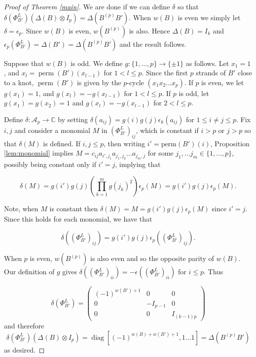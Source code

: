 \documentclass{amsart}[11pt,fullpage]
\def\C{{\mathbb C}}
\def\A{{\mathcal A}}
\newcommand\diag{\operatorname{diag}}
\newcommand\perm{\operatorname{perm}}
\theoremstyle{definition}
\begin{document}
\begin{proof}[Proof of Theorem \ref{main}]
We are done if we can define $\delta$ so that $\delta\left(\Phi_{B'}^L\right)\left(\Delta(B)\otimes I_p\right) = \Delta(B^{(p)}B')$. When $w(B)$ is even we simply let $\delta = \epsilon_p$. Since $w(B)$ is even, $w(B^{(p)})$ is also. Hence $\Delta(B)=I_k$ and $\epsilon_p\left(\Phi_{B'}^L\right) = \Delta(B') = \Delta(B^{(p)}B')$ and the result follows.

Suppose that $w(B)$ is odd. We define $g\colon \{1,\ldots,p\}\rightarrow \{\pm 1\}$ as follows. Let $x_1 = 1$, and $x_l = \perm(B')(x_{l-1})$ for $1<l\le p$. Since the first $p$ strands of $B'$ close to a knot, $\perm(B')$ is given by the $p$-cycle $(x_1x_2\ldots x_p)$. If $p$ is even, we let $g(x_1) = 1$, and $g(x_l) = -g(x_{l-1})$ for $1<l\le p$. If $p$ is odd, let $g(x_1) = g(x_2) = 1$ and $g(x_l) = -g(x_{l-1})$ for $2<l\le p$.

 Define $\delta: \A_p\to \C$ by setting $\delta(a_{ij}) = g(i)g(j)\epsilon_k(a_{ij})$ for $1\le i\ne j\le p$. Fix $i,j$ and consider a monomial $M$ in $\left(\Phi_{B'}^L\right)_{ij}$, which is constant if $i>p$ or $j>p$ so that $\delta(M)$ is defined. If $i,j\le p$, then writing $i'=\text{perm}(B')(i)$, Proposition \ref{lem:monomial} implies $M=c_{ij}a_{i',j_1}a_{j_1,j_2}\ldots a_{j_m,j}$ for some $j_1,\ldots j_m\in \{1,\ldots,p\}$, possibly being constant only if $i'=j$, implying that 

$$\delta(M) = g(i')g(j)\left(\prod_{k=1}^m g(j_k)^2\right)\epsilon_p(M) = g(i')g(j)\epsilon_p(M).$$

\noindent Note, when $M$ is constant then $\delta(M) = M = g(i')g(j)\epsilon_p(M)$ since $i'=j$. Since this holds for each monomial, we have that

$$\delta\left(\left(\Phi_{B'}^L\right)_{ij}\right) = g(i')g(j)\epsilon_p\left(\left(\Phi_{B'}^L\right)_{ij}\right).$$

When $p$ is even, $w(B^{(p)})$ is also even and so the opposite parity of $w(B)$. Our definition of $g$ gives $\delta\left(\left(\Phi_{B'}^L\right)_{ii}\right) = -\epsilon\left(\left(\Phi_{B'}^L\right)_{ii}\right)$ for $i\le p$. Thus 

$$\delta\left(\Phi_{B'}^L\right) = 
\left( \begin{array}{ccc}
(-1)^{w(B')+1} & 0 & 0 \\
0 & -I_{p-1} & 0 \\
0 & 0 & I_{(k-1)p} \end{array} \right)
$$
\noindent and therefore
$$
\delta\left(\Phi_{B'}^L\right)\left(\Delta(B)\otimes I_p\right) = \diag[(-1)^{w(B) + w(B') + 1},1\ldots 1] = \Delta(B^{(p)}B')
$$
\noindent as desired.


\end{proof}
\end{document}
